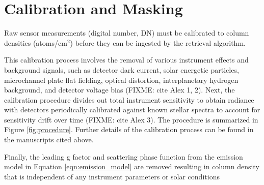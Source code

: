 \documentclass[pdflatex,twocolumn,sn-mathphys-num]{sn-jnl}
\begin{document}

\section{Calibration and Masking}

Raw sensor measurements (digital number, DN) must be calibrated to column densities (atoms/cm$^2$) before they can be ingested by the retrieval algorithm.

This calibration process involves the removal of various instrument effects and background signals, such as detector dark current, solar energetic particles, microchannel plate flat fielding, optical distortion, interplanetary hydrogen background, and detector voltage bias (FIXME: cite Alex 1, 2).  Next, the calibration procedure divides out total instrument sensitivity to obtain radiance with detectors periodically calibrated against known stellar spectra to account for sensitivity drift over time (FIXME: cite Alex 3).
The procedure is summarized in Figure \ref{fig:procedure}. Further details of the calibration process can be found in the manuscripts cited above.

Finally, the leading g factor and scattering phase function from the emission model in Equation \ref{eqn:emission_model} are removed resulting in column density that is independent of any instrument parameters or solar conditions
\end{document}
